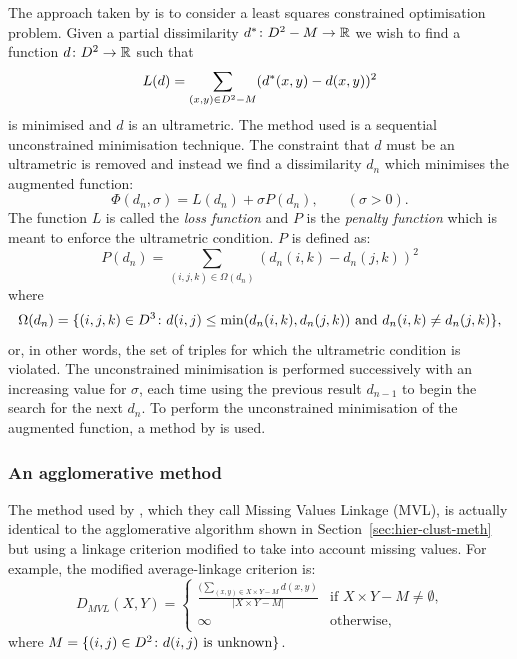 The approach taken by \citet{de1984ultrametric} is to consider a least squares
constrained optimisation problem.  Given a partial dissimilarity $d^* \colon
D^2 - M \to {\mathbb R}$ we wish to find a function $d \colon D^2 \to {\mathbb R}$
such that
\begin{equation}
  \label{eq:partial-dist-least-squares}
  L(d) = \sum_{(x,y) \in D^2 - M} (d^*(x,y)-d(x,y))^2
\end{equation}
is minimised and $d$ is an ultrametric.  The method used is a sequential
unconstrained minimisation technique.  The constraint that $d$ must be an
ultrametric is removed and instead we find a dissimilarity $d_n$ which minimises
the augmented function:
\begin{equation}
  \label{eq:partial-dist-optimisation}
  \Phi(d_n,\sigma) = L(d_n) + \sigma P(d_n), \qquad (\sigma > 0).
\end{equation}
The function $L$ is called the \textit{loss function} and $P$ is the
\textit{penalty function} which is meant to enforce the ultrametric
condition.  $P$ is defined as:
\begin{equation}
  \label{eq:penalty-function}
  P(d_n) = \sum_{(i,j,k) \in \Omega(d_n)} (d_n(i,k) - d_n(j,k))^2
\end{equation}
where
\begin{equation*}
  \Omega(d_n) = \{(i,j,k) \in D^3 \colon d(i,j) \leq \min(d_n(i,k),d_n(j,k))
  \text{ and } d_n(i,k) \neq d_n(j,k)\},
\end{equation*}
or, in other words, the set of triples for which the ultrametric condition is
violated.  The unconstrained minimisation is performed successively with an
increasing value for $\sigma$, each time using the previous result $d_{n-1}$
to begin the search for the next $d_n$.  To perform the unconstrained
minimisation of the augmented function, a method by \citet{powell1977restart}
is used.

\subsubsection{An agglomerative method}
\label{sec:part-dist-agglom-method}

The method used by \citet{schader1992mvl}, which they call Missing Values
Linkage (MVL), is actually identical to the agglomerative algorithm shown in
Section~\ref{sec:hier-clust-meth} but using a linkage criterion modified to
take into account missing values.  For example, the modified average-linkage
criterion is:
\begin{equation*}
  D_{MVL}(X,Y) =
  \begin{cases}
    \displaystyle
    \frac{(\sum_{(x,y) \in X \times Y - M} d(x,y)}{|X \times Y - M|} & \text{if $X
      \times Y - M \neq \emptyset$,} \\
    \infty & \text{otherwise},
  \end{cases}
\end{equation*}
where $M = \{(i,j) \in D^2 \colon d(i,j) \text{ is unknown}\}$.


